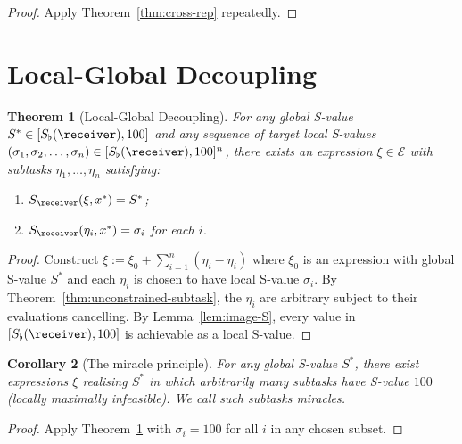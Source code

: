 \documentclass[11pt,a4paper]{article}
\theoremstyle{thmstyle}
\newtheorem{theorem}{Theorem}[section]
\newtheorem{corollary}[theorem]{Corollary}
\theoremstyle{thmstyle}
\theoremstyle{definition}
\theoremstyle{remark}
\newcommand{\Expr}{\mathcal{E}}
\newcommand{\Sscalar}{S}
\newcommand{\Sfloor}{S_{\flat}}
\begin{document}
\begin{proof}
Apply Theorem~\ref{thm:cross-rep} repeatedly.
\end{proof}

\section{Local-Global Decoupling}
\label{sec:local-global-decoupling}

\begin{theorem}[Local-Global Decoupling]\label{thm:lg-decoupling}
For any global S-value $\Sscalar^{*} \in
[\Sfloor(\receiver), 100]$ and any sequence of target
local S-values
$(\sigma_{1}, \sigma_{2}, \ldots, \sigma_{n})
\in [\Sfloor(\receiver), 100]^{n}$, there exists an
expression $\xi \in \Expr$ with subtasks
$\eta_{1}, \ldots, \eta_{n}$ satisfying:
\begin{enumerate}[nosep,label=(\roman*)]
\item $\Sscalar_{\receiver}(\xi, x^{*}) = \Sscalar^{*}$;
\item $\Sscalar_{\receiver}(\eta_{i}, x^{*}) = \sigma_{i}$
      for each $i$.
\end{enumerate}
\end{theorem}

\begin{proof}
Construct $\xi := \xi_{0} + \sum_{i=1}^{n} (\eta_{i} - \eta_{i})$
where $\xi_{0}$ is an expression with global S-value
$\Sscalar^{*}$ and each $\eta_{i}$ is chosen to have
local S-value $\sigma_{i}$.  By
Theorem~\ref{thm:unconstrained-subtask}, the
$\eta_{i}$ are arbitrary subject to their evaluations
cancelling.  By Lemma~\ref{lem:image-S}, every value
in $[\Sfloor(\receiver), 100]$ is achievable as a
local S-value.
\end{proof}

\begin{corollary}[The miracle principle]\label{cor:miracle}
For any global S-value $\Sscalar^{*}$, there exist
expressions $\xi$ realising $\Sscalar^{*}$ in which
arbitrarily many subtasks have S-value $100$
(\emph{locally maximally infeasible}).  We call such
subtasks \emph{miracles}.
\end{corollary}

\begin{proof}
Apply Theorem~\ref{thm:lg-decoupling} with
$\sigma_{i} = 100$ for all $i$ in any chosen subset.
\end{proof}

\clearpage

\end{document}
